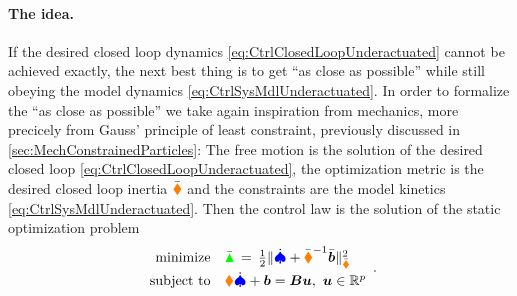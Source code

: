 \paragraph{The idea.}
If the desired closed loop dynamics \eqref{eq:CtrlClosedLoopUnderactuated} cannot be achieved exactly, the next best thing is to get ``as close as possible'' while still obeying the model dynamics \eqref{eq:CtrlSysMdlUnderactuated}.
In order to formalize the ``as close as possible'' we take again inspiration from mechanics, more precicely from Gauss' principle of least constraint, previously discussed in \autoref{sec:MechConstrainedParticles}:
The free motion is the solution of the desired closed loop \eqref{eq:CtrlClosedLoopUnderactuated}, the optimization metric is the desired closed loop inertia $\sysInertiaMatC$ and the constraints are the model kinetics \eqref{eq:CtrlSysMdlUnderactuated}.
Then the control law is the solution of the static optimization problem
\begin{align}\label{eq:MinProbUnderactuated}
 \begin{array}{rl}
  \text{minimize} & \GaussianConstraintC \, = \, \tfrac{1}{2} \norm[\sysInertiaMatC]{\sysVeld + \sysInertiaMatC^{-1} \sysForceC}^2
  \\[1ex]
  \text{subject to} & \sysInertiaMat \sysVeld + \sysForce = \sysInputMat \sysInput, \ \sysInput \in \RealNum^\numInputs 
 \end{array}
 .
\end{align}

